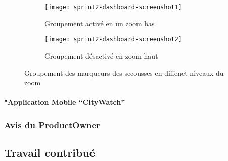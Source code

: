 \begin{figure}[htbp]
    \begin{subfigure}{.5\textwidth}
    \centering
  \centering
  \texttt{[image: sprint2-dashboard-screenshot1]}
  \caption{Groupement activé en un zoom bas}
  \label{fig:sprint2-dashboard-screenshot1}
\end{subfigure}
\begin{subfigure}{.5\textwidth}
    \centering
  \centering
  \texttt{[image: sprint2-dashboard-screenshot2]}
  \caption{Groupement désactivé en zoom haut}
  \label{fig:sprint2-dashboard-screenshot2}
\end{subfigure}
\caption{Groupement des marqueurs des secousses en diffenet niveaux du zoom}
\end{figure}


\paragraph{"Application Mobile ``CityWatch''}
\subsubsection{Avis du ProductOwner}
\subsection{Travail contribué}
